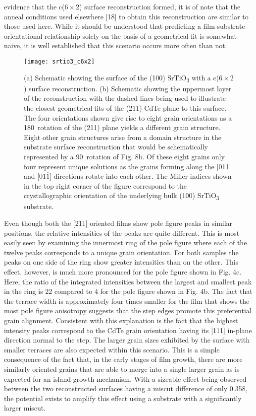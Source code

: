 evidence that the c($6\times2$) surface reconstruction formed, it is of
note that the anneal conditions used elsewhere [18] to obtain this
reconstruction are similar to those used here. While it should be
understood that predicting a film-substrate orientational relationship solely on the basis of a geometrical fit is somewhat naive, it is well established that this scenario occurs more often than not.
\begin{figure}
    \centering
    \texttt{[image: srtio3\_c6x2]}
    \caption{\label{fig:srtio3_c6x2}(a) Schematic showing the surface of the (100) SrTiO\textsubscript{3} with a c($6\times2$) surface reconstruction. (b) Schematic showing the uppermost layer of the reconstruction with the
        dashed lines being used to illustrate the closest geometrical fits of the (211) CdTe plane to this surface. The four orientations shown give rise to eight grain orientations as a
        180\degree~rotation of the (211) plane yields a different grain structure. Eight other grain structures arise from a domain structure in the substrate surface reconstruction that
        would be schematically represented by a 90\degree~rotation of Fig. 8b. Of these eight grains only four represent unique solutions as the grains forming along the [011] and [01$\overline{1}$]
        directions rotate into each other. The Miller indices shown in the top right corner of the figure correspond to the crystallographic orientation of the underlying bulk (100)
        SrTiO\textsubscript{3} substrate.}
\end{figure}

Even though both the [211] oriented films show pole figure
peaks in similar positions, the relative intensities of the peaks are
quite different. This is most easily seen by examining the
innermost ring of the pole figure where each of the twelve peaks
corresponds to a unique grain orientation. For both samples the
peaks on one side of the ring show greater intensities than on the
other. This effect, however, is much more pronounced for the pole
figure shown in Fig. 4c. Here, the ratio of the integrated intensities
between the largest and smallest peak in the ring is 22 compared to
4 for the pole figure shown in Fig. 4b. The fact that the terrace
width is approximately four times smaller for the film that shows
the most pole figure anisotropy suggests that the step edges
promote this preferential grain alignment. Consistent with this
explanation is the fact that the highest intensity peaks correspond
to the CdTe grain orientation having its [111] in-plane direction
normal to the step. The larger grain sizes exhibited by the surface
with smaller terraces are also expected within this scenario. This is
a simple consequence of the fact that, in the early stages of film
growth, there are more similarly oriented grains that are able to
merge into a single larger grain as is expected for an island growth
mechanism. With a sizeable effect being observed between the two
reconstructed surfaces having a miscut difference of only 0.358, the
potential exists to amplify this effect using a substrate with a
significantly larger miscut.
